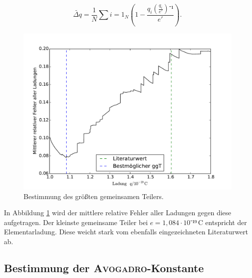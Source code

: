 \begin{equation}
\tilde{\Delta{q}}=\frac{1}{N}\sum i=1_N \left(1-\frac{q_i\left(\frac{q_i}{e'}\right)⁻¹}{e'}\right).
\end{equation}
\begin{figure}
	\centering
	\includegraphics[width=\textwidth]{Bilder/plot_ggT}
	\caption{Bestimmung des größten gemeinsamen Teilers.}
	\label{fig:2}
\end{figure}
In Abbildung \ref{fig:2} wird der mittlere relative Fehler aller Ladungen gegen diese aufgetragen. Der kleinste gemeinsame Teiler bei $e=1,084\cdot10⁻¹⁹\,\si\coulomb$ entspricht der Elementarladung. Diese weicht stark vom ebenfalls eingezeichneten Literaturwert \cite{texas_instruments1} ab. 

\subsection{Bestimmung der \textsc{Avogadro}-Konstante}

